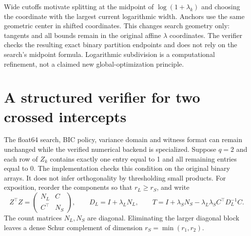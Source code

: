 \documentclass[11pt,a4paper]{article}
\theoremstyle{remark}\newtheorem{remark}[theorem]{Remark}
\begin{document}
Wide cutoffs motivate splitting at the midpoint of $\log(1+\lambda_k)$ and
choosing the coordinate with the largest current logarithmic width. Anchors
use the same geometric center in shifted coordinates. This changes search
geometry only: tangents and all bounds remain in the original affine $\lambda$
coordinates. The verifier checks the resulting exact binary partition endpoints
and does not rely on the search's midpoint formula. Logarithmic subdivision is
a computational refinement, not a claimed new global-optimization principle.

\section{A structured verifier for two crossed intercepts}\label{sec:structured}
The float64 search, BIC policy, variance domain and witness format can remain
unchanged while the verified numerical backend is specialized. Suppose $q=2$
and each row of $Z_k$ contains exactly one entry equal to 1 and all remaining
entries equal to 0. The implementation checks this condition on the original
binary arrays. It does not infer orthogonality by thresholding small products.
For exposition, reorder the components so that $r_L\geq r_S$, and write
\[
Z^\top Z=\begin{pmatrix}N_L&C\\C^\top&N_S\end{pmatrix},\qquad
D_L=I+\lambda_LN_L,\qquad
T=I+\lambda_SN_S-\lambda_L\lambda_SC^\top D_L^{-1}C.
\]
The count matrices $N_L,N_S$ are diagonal. Eliminating the larger diagonal block
leaves a dense Schur complement of dimension $r_S=\min(r_1,r_2)$.
\end{document}
